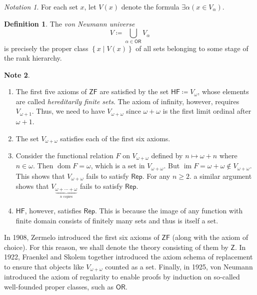 \documentclass[10pt,letterpaper,cm]{nupset}
\theoremstyle{definition}
\newtheorem{definition}{Definition}[subsection]
\newtheorem{note}[definition]{Note}
\theoremstyle{theorem}
\theoremstyle{remark}
\newtheorem*{notation}{Notation}
\newcommand{\1}{\mathbf{1}}
\newcommand{\0}{\vec 0}
\newcommand{\z}{\mathsf{Z}}
\newcommand{\zf}{\mathsf{ZF}}
\newcommand{\ord}{\mathsf{OR}}
\DeclareMathOperator{\im}{im}
\DeclareMathOperator{\dom}{dom}
\begin{document}
 
 \begin{notation}
For each set $x$, let $V(x)$ denote the formula ${\exists \alpha(x\in V_{\alpha})}$.
\end{notation}

\begin{definition}
The \textit{von Neumann universe} $$V \coloneqq \bigcup_{\alpha \in \ord}V_{\alpha}$$ is precisely the proper class $\left\{x \mid V(x)\right\}$ of all sets  belonging to some stage of the rank hierarchy. 
\end{definition}
 
 \begin{note} $ $
 \begin{enumerate}
 \item The first five axioms  of $\zf$ are satisfied by the set $\mathsf{HF}\coloneqq V_{\omega}$, whose elements are called \textit{hereditarily finite sets}. The axiom of infinity, however, requires $V_{\omega +1}$. Thus, we need to have $V_{\omega + \omega}$ since $\omega + \omega$ is the first limit ordinal after $\omega +1$.
 \item The set $V_{\omega +\omega}$ satisfies each of the first six axioms. 
 \item Consider the functional relation $F$ on $V_{\omega +\omega}$ defined by $n \mapsto \omega + n$ where $n \in \omega$. Then $\dom{F} = \omega$, which is a set in $V_{\omega +\omega}$. But $\im{F} = \omega + \omega \notin V_{\omega + \omega}$. This shows that $V_{\omega +\omega}$ fails to satisfy $\mathsf{Rep}$. For any $n\geq 2$. a similar argument shows that $V_{\underbrace{\omega + \cdots + \omega}_{n \text{ copies}}}$ fails to satisfy $\mathsf{Rep}$.
 \item $\mathsf{HF}$, however, satisfies  $\mathsf{Rep}$. This is because the image of any function  with  finite domain consists of finitely many sets and thus is itself a set. 
 \end{enumerate}
\end{note}

\medskip

In 1908, Zermelo introduced the first six axioms of $\zf$ (along with the axiom of choice). For this reason, we shall denote the theory consisting of them by $\z$. In  1922, Fraenkel and Skolem together introduced the axiom schema of replacement to ensure that objects like $V_{\omega + \omega}$ counted as a set. Finally, in 1925, von Neumann  introduced the axiom of regularity to enable proofs by induction on so-called well-founded proper classes, such as $\ord$.
\end{document}
